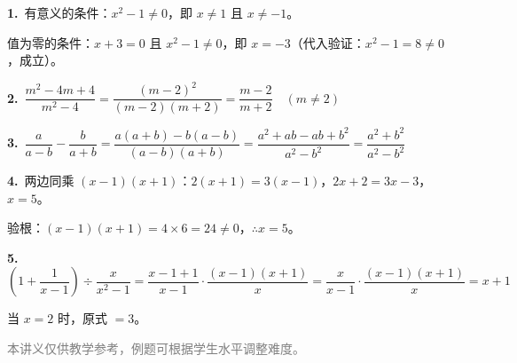 \documentclass[12pt, a4paper]{ctexart}
\begin{document}
\begin{knowledgebox}[参考答案]
\textbf{1.}\ 有意义的条件：$x^2 - 1 \neq 0$，即 $x \neq 1$ 且 $x \neq -1$。

值为零的条件：$x + 3 = 0$ 且 $x^2 - 1 \neq 0$，即 $x = -3$（代入验证：$x^2-1 = 8 \neq 0$，成立）。

\medskip
\textbf{2.}\ $\dfrac{m^2 - 4m + 4}{m^2 - 4} = \dfrac{(m-2)^2}{(m-2)(m+2)} = \dfrac{m-2}{m+2} \quad (m \neq 2)$

\medskip
\textbf{3.}\ $\dfrac{a}{a-b} - \dfrac{b}{a+b} = \dfrac{a(a+b) - b(a-b)}{(a-b)(a+b)} = \dfrac{a^2+ab-ab+b^2}{a^2-b^2} = \dfrac{a^2+b^2}{a^2-b^2}$

\medskip
\textbf{4.}\ 两边同乘 $(x-1)(x+1)$：$2(x+1) = 3(x-1)$，$2x+2=3x-3$，$x=5$。

验根：$(x-1)(x+1) = 4 \times 6 = 24 \neq 0$，$\therefore x = 5$。

\medskip
\textbf{5.}\ $\left(1 + \dfrac{1}{x-1}\right) \div \dfrac{x}{x^2-1} = \dfrac{x-1+1}{x-1} \cdot \dfrac{(x-1)(x+1)}{x} = \dfrac{x}{x-1} \cdot \dfrac{(x-1)(x+1)}{x} = x+1$

当 $x = 2$ 时，原式 $= 3$。
\end{knowledgebox}

\vfill
\begin{center}
\small\textcolor{gray}{本讲义仅供教学参考，例题可根据学生水平调整难度。}
\end{center}
\end{document}
